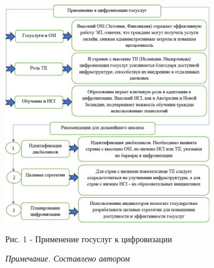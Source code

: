 \begin{figure}[H]
	\centering
	\includegraphics[width=0.82\textwidth]{media/ekon/image8}
	\caption*{Рис. 1 - Применение госуслуг к цифровизации}
	\caption*{\normalfont \emph{Примечание. Составлено автором}}
\end{figure}


